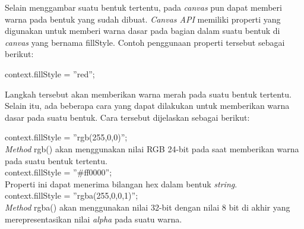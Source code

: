 Selain menggambar suatu bentuk tertentu, pada \textit{canvas} pun dapat memberi warna pada bentuk yang sudah dibuat. \textit{Canvas API} memiliki properti yang digunakan untuk memberi warna dasar pada bagian dalam suatu bentuk di \textit{canvas} yang bernama fillStyle. Contoh penggunaan properti tersebut sebagai berikut:

context.fillStyle = ''red'';

Langkah tersebut akan memberikan warna merah pada suatu bentuk tertentu. Selain itu, ada beberapa cara yang dapat dilakukan untuk memberikan warna dasar pada suatu bentuk. Cara tersebut dijelaskan sebagai berikut:

context.fillStyle = ''rgb(255,0,0)'';\\
\textit{Method} rgb() akan menggunakan nilai RGB 24-bit pada saat memberikan warna pada suatu bentuk tertentu.\\

context.fillStyle = ''\#ff0000'';\\
Properti ini dapat menerima bilangan hex dalam bentuk \textit{string}.\\

context.fillStyle = ''rgba(255,0,0,1)'';\\
\textit{Method} rgba() akan menggunakan nilai 32-bit dengan nilai 8 bit di akhir yang merepresentasikan nilai \textit{alpha} pada suatu warna. 
